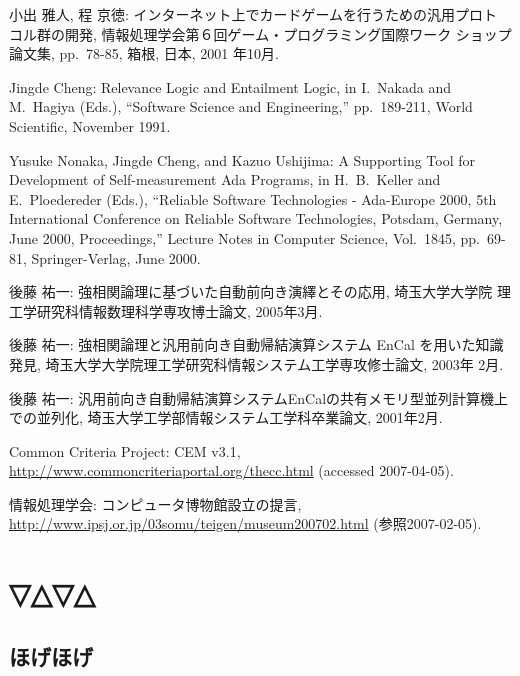 \documentclass[12pt,dvipdfmx]{jreport}
\begin{document}
\begin{thebibliography}{99}
小出 雅人, 程 京徳: インターネット上でカードゲームを行うための汎用プロト
        コル群の開発, 情報処理学会第６回ゲーム・プログラミング国際ワーク
        ショップ論文集, pp.\ 78-85, 箱根, 日本, 2001 年10月.

Jingde Cheng: Relevance Logic and Entailment Logic, in I.\ Nakada and
        M.\ Hagiya (Eds.), ``Software Science and Engineering,''
        pp.\ 189-211, World Scientific, November 1991.

Yusuke Nonaka, Jingde Cheng, and Kazuo Ushijima: A Supporting Tool for
        Development of Self-measurement Ada Programs, in H.\ B.\ Keller
        and E.\ Ploedereder (Eds.), ``Reliable Software Technologies -
        Ada-Europe 2000, 5th International Conference on Reliable
        Software Technologies, Potsdam, Germany, June 2000,
        Proceedings,'' Lecture Notes in Computer Science, Vol.\ 1845,
        pp.\ 69-81, Springer-Verlag, June 2000.


後藤 祐一: 強相関論理に基づいた自動前向き演繹とその応用, 埼玉大学大学院
	理工学研究科情報数理科学専攻博士論文, 2005年3月.

後藤 祐一: 強相関論理と汎用前向き自動帰結演算システム EnCal を用いた知識
	発見, 埼玉大学大学院理工学研究科情報システム工学専攻修士論文, 2003年
	2月.

後藤 祐一: 汎用前向き自動帰結演算システムEnCalの共有メモリ型並列計算機上
	での並列化, 埼玉大学工学部情報システム工学科卒業論文, 2001年2月.


Common Criteria Project: CEM v3.1,
\url{http://www.commoncriteriaportal.org/thecc.html}
(accessed 2007-04-05).

情報処理学会: コンピュータ博物館設立の提言, \url{http://www.ipsj.or.jp/03somu/teigen/museum200702.html} (参照2007-02-05).

\end{thebibliography}

\appendix %
\chapter{▽△▽△}
\section{ほげほげ}
\end{document}
